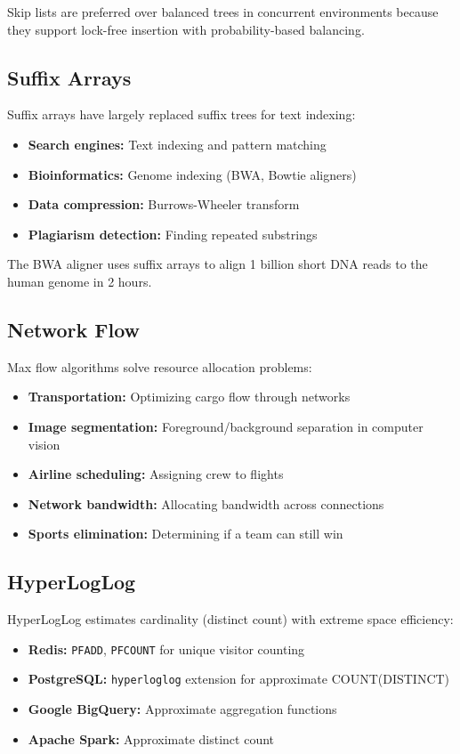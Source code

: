 Skip lists are preferred over balanced trees in concurrent environments because they support lock-free insertion with probability-based balancing.

\subsection{Suffix Arrays}

Suffix arrays have largely replaced suffix trees for text indexing:
\begin{itemize}
    \item \textbf{Search engines:} Text indexing and pattern matching
    \item \textbf{Bioinformatics:} Genome indexing (BWA, Bowtie aligners)
    \item \textbf{Data compression:} Burrows-Wheeler transform
    \item \textbf{Plagiarism detection:} Finding repeated substrings
\end{itemize}

The BWA aligner uses suffix arrays to align 1 billion short DNA reads to the human genome in 2 hours.

\subsection{Network Flow}

Max flow algorithms solve resource allocation problems:
\begin{itemize}
    \item \textbf{Transportation:} Optimizing cargo flow through networks
    \item \textbf{Image segmentation:} Foreground/background separation in computer vision
    \item \textbf{Airline scheduling:} Assigning crew to flights
    \item \textbf{Network bandwidth:} Allocating bandwidth across connections
    \item \textbf{Sports elimination:} Determining if a team can still win
\end{itemize}

\subsection{HyperLogLog}

HyperLogLog estimates cardinality (distinct count) with extreme space efficiency:
\begin{itemize}
    \item \textbf{Redis:} \texttt{PFADD}, \texttt{PFCOUNT} for unique visitor counting
    \item \textbf{PostgreSQL:} \texttt{hyperloglog} extension for approximate COUNT(DISTINCT)
    \item \textbf{Google BigQuery:} Approximate aggregation functions
    \item \textbf{Apache Spark:} Approximate distinct count
\end{itemize}

